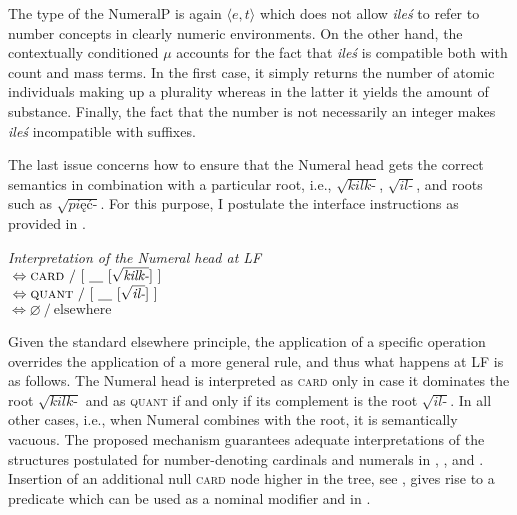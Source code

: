 \documentclass[output=paper, newtxmath, colorlinks, citecolor=brown]{langsci/langscibook}
\begin{document}
    The type of the NumeralP is again $\langle e,t\rangle$ which does not allow \textit{ileś} to refer to number concepts in clearly numeric environments. On the other hand, the contextually conditioned  $\mu$ accounts for the fact that \textit{ileś} is compatible both with count and mass terms. In the first case, it simply returns the number of atomic individuals making up a plurality whereas in the latter it yields the amount of substance. Finally, the fact that the  number is not necessarily an integer makes \textit{ileś} incompatible with  suffixes.

    The last issue concerns how to ensure that the Numeral head gets the correct semantics in combination with a particular root, i.e., $\sqrt{\textit{kilk-}}$, $\sqrt{\textit{il-}}$, and  roots such as $\sqrt{\textit{pięć-}}$. For this purpose, I postulate the interface instructions as provided in .

	\ea  \textit{Interpretation of the  Numeral head at LF}\smallskip\label{ex:numeral-lf-interpretation}\\
     \tabto{1.5cm}${}\Leftrightarrow \textsc{card}\ /\ [\ \underline{\hspace{1em}}\ [\sqrt{\textit{kilk-}}]\ ]$\\
    \tabto{1.5cm}${}\Leftrightarrow \textsc{quant}\ /\ [\ \underline{\hspace{1em}}\ [\sqrt{\textit{il-}}]\ ]$\vspace{1pt}\\
    \tabto{1.5cm}${}\Leftrightarrow \varnothing\ /\ \text{elsewhere}$
	\z

	\noindent Given the standard elsewhere principle, the application of a specific operation overrides the application of a more general rule, and thus what happens at LF is as follows. The Numeral head is interpreted as \textsc{card} only in case it dominates the root $\sqrt{\textit{kilk-}}$ and as \textsc{quant} if and only if its complement is the root $\sqrt{\textit{il-}}$. In all other cases, i.e., when Numeral combines with the  root, it is semantically vacuous. The proposed mechanism guarantees adequate interpretations of the structures postulated for number-denoting cardinals and  numerals in , , and . Insertion of an additional null \textsc{card} node higher in the tree, see , gives rise to a  predicate which can be used as a nominal modifier and in .
\end{document}
